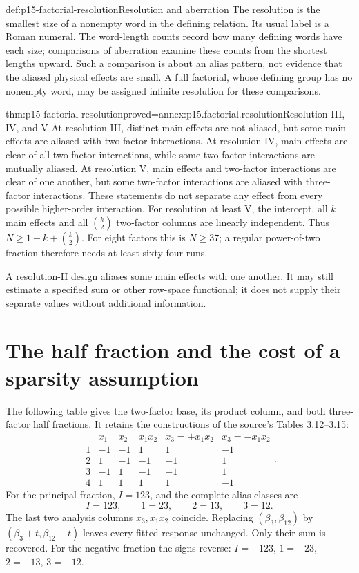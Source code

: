 \begin{hbdefinition}{def:p15-factorial-resolution}{Resolution and aberration}
The resolution is the smallest size of a nonempty word in the defining
relation. Its usual label is a Roman numeral. The word-length counts record
how many defining words have each size; comparisons of aberration examine
these counts from the shortest lengths upward. Such a comparison is about
an alias pattern, not evidence that the aliased physical effects are small.
A full factorial, whose defining group has no nonempty word, may be assigned
infinite resolution for these comparisons.
\end{hbdefinition}

\begin{hbcorollary}{thm:p15-factorial-resolution}{proved=annex:p15.factorial.resolution}{Resolution III, IV, and V}
At resolution III, distinct main effects are not aliased, but some main
effects are aliased with two-factor interactions. At resolution IV, main
effects are clear of all two-factor interactions, while some two-factor
interactions are mutually aliased. At resolution V, main effects and
two-factor interactions are clear of one another, but some two-factor
interactions are aliased with three-factor interactions. These statements
do not separate any effect from every possible higher-order interaction.
For resolution at least V, the intercept, all \(k\) main effects and all
\(\binom{k}{2}\) two-factor columns are linearly independent. Thus
\(N\geq1+k+\binom{k}{2}\). For eight factors this is \(N\geq37\);
a regular power-of-two fraction therefore needs at least sixty-four runs.
\end{hbcorollary}

A resolution-II design aliases some main effects with one another. It may
still estimate a specified sum or other row-space functional; it does not
supply their separate values without additional information.

\section{The half fraction and the cost of a sparsity assumption}
\label{sec:p15-factorial-half}

The following table gives the two-factor base, its product column, and both
three-factor half fractions. It retains the constructions of the source's
Tables 3.12--3.15:
\[
\begin{array}{c|rr|r|rr}
 &x_1&x_2&x_1x_2&x_3=+x_1x_2&x_3=-x_1x_2\\\hline
1&-1&-1&1&1&-1\\2&1&-1&-1&-1&1\\
3&-1&1&-1&-1&1\\4&1&1&1&1&-1
\end{array}.
\]
For the principal fraction, \(I=123\), and the complete alias classes are
\[
 I=123,\qquad 1=23,\qquad2=13,\qquad3=12.
\]
The last two analysis columns \(x_3,x_1x_2\) coincide. Replacing
\((\beta_3,\beta_{12})\) by
\((\beta_3+t,\beta_{12}-t)\) leaves every fitted response unchanged.
Only their sum is recovered. For the negative fraction the signs reverse:
\(I=-123\), \(1=-23\), \(2=-13\), \(3=-12\).


